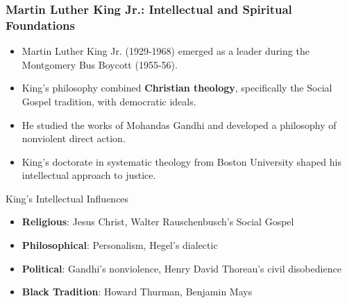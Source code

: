 \documentclass{beamer}
\begin{document}
	\begin{frame}
		\frametitle{Martin Luther King Jr.: Intellectual and Spiritual Foundations}
		
		\begin{itemize}
			\item Martin Luther King Jr. (1929-1968) emerged as a leader during the Montgomery Bus Boycott (1955-56).
			\item King's philosophy combined \textbf{Christian theology}, specifically the Social Gospel tradition, with democratic ideals.
			\item He studied the works of Mohandas Gandhi and developed a philosophy of nonviolent direct action.
			\item King's doctorate in systematic theology from Boston University shaped his intellectual approach to justice.
		\end{itemize}
		
		\begin{block}{King's Intellectual Influences}
			\scriptsize
			\begin{itemize}
				\item \textbf{Religious}: Jesus Christ, Walter Rauschenbusch's Social Gospel
				\item \textbf{Philosophical}: Personalism, Hegel's dialectic
				\item \textbf{Political}: Gandhi's nonviolence, Henry David Thoreau's civil disobedience
				\item \textbf{Black Tradition}: Howard Thurman, Benjamin Mays
			\end{itemize}
		\end{block}
		
	\end{frame}
	
\end{document}
